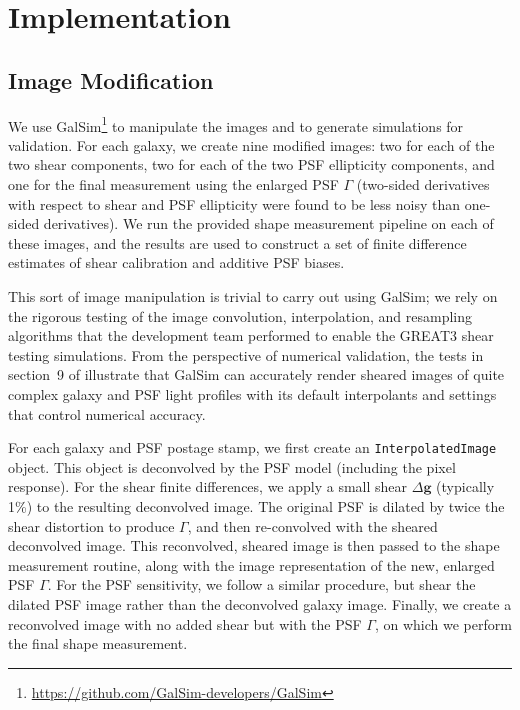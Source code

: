 \documentclass[iop]{emulateapj}
\newcommand\rmcomment[1]{\textcolor{red}{(RM: #1)}}
\begin{document}
\section{Implementation}
\subsection{Image Modification}\label{subsec:imagemod}
We use
GalSim\footnote{\url{https://github.com/GalSim-developers/GalSim}} to
manipulate the images and to generate simulations for validation. For
each galaxy, we create nine modified images: two for each of the two
shear components, two for each of the two PSF ellipticity components,
and one for the final measurement using the enlarged PSF $\Gamma$
(two-sided derivatives with respect to shear and PSF ellipticity were
found to be less noisy than one-sided derivatives).  We run the
provided shape measurement pipeline on each of these images, and the
results are used to construct a set of finite difference estimates of
shear calibration and additive PSF biases.

This sort of image manipulation is trivial to carry out using GalSim;
we rely on the rigorous testing of the image convolution,
interpolation, and resampling algorithms that the development team
performed to enable the GREAT3 shear testing simulations.  From the
perspective of numerical validation, the tests in section~9 of
\cite{2015A&C....10..121R} illustrate that GalSim can accurately
render sheared images of quite complex galaxy and PSF light profiles
with its default interpolants and settings that control numerical accuracy.

For each galaxy and PSF postage stamp, we first create an
\texttt{InterpolatedImage} object. This object is deconvolved by the
PSF model (including the pixel response). For the shear finite
differences, we apply a small shear $\Delta\mathbf{g}$ (typically 1\%)
to the resulting deconvolved image. The original PSF is dilated by
twice the shear distortion to produce $\Gamma$, and then re-convolved
with the sheared deconvolved image. This reconvolved, sheared image is
then passed to the shape measurement routine, along with the image
representation of the new, enlarged PSF $\Gamma$. For the PSF
sensitivity, we follow a similar procedure, but shear the dilated PSF
image rather than the deconvolved galaxy image. Finally, we create a
reconvolved image with no added shear but with the PSF $\Gamma$, on
which we perform the final shape measurement.

\end{document}
